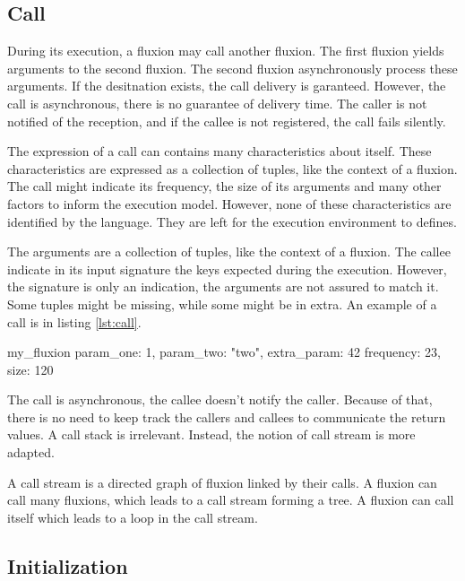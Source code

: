 \subsection{Call}

During its execution, a fluxion may call another fluxion.
The first fluxion yields arguments to the second fluxion.
The second fluxion asynchronously process these arguments.
If the desitnation exists, the call delivery is garanteed.
However, the call is asynchronous, there is no guarantee of delivery time.
The caller is not notified of the reception, and if the callee is not registered, the call fails silently.

The expression of a call can contains many characteristics about itself.
These characteristics are expressed as a collection of tuples, like the context of a fluxion.
The call might indicate its frequency, the size of its arguments and many other factors to inform the execution model.
However, none of these characteristics are identified by the language.
They are left for the execution environment to defines.

The arguments are a collection of tuples, like the context of a fluxion.
The callee indicate in its input signature the keys expected during the execution.
However, the signature is only an indication, the arguments are not assured to match it.
Some tuples might be missing, while some might be in extra.
An example of a call is in listing \ref{lst:call}.

\begin{code}[flx, %
             caption={Call of a fluxion}, %
             label={lst:call}] %
my_fluxion {
  param_one: 1,
  param_two: "two",
  extra_param: 42
}{
  frequency: 23,
  size: 120
}
\end{code}

The call is asynchronous, the callee doesn't notify the caller.
Because of that, there is no need to keep track the callers and callees to communicate the return values.
A call stack is irrelevant.
Instead, the notion of call stream is more adapted.

A call stream is a directed graph of fluxion linked by their calls.
A fluxion can call many fluxions, which leads to a call stream forming a tree.
A fluxion can call itself which leads to a loop in the call stream.

\subsection{Initialization}

